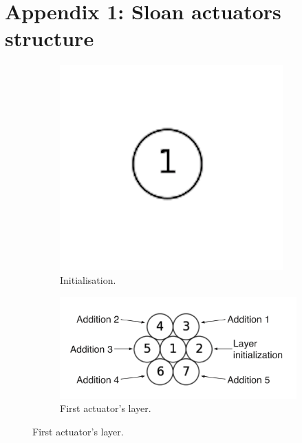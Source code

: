 \section{Appendix 1: Sloan actuators structure}

\begin{figure}[h]
\begin{center}
	\begin{subfigure}{0.22\textwidth}
	\includegraphics[width=\textwidth]{circles/initialisation}
	\caption{Initialisation.}
	\label{fig:appendix:sloan_structure:initialization}
	\end{subfigure}
	\begin{subfigure}{0.54\textwidth}
	\includegraphics[width=\textwidth]{circles/layer_1}
	\caption{First actuator's layer.}
	\label{fig:appendix:sloan_structure:layer_1}
	\end{subfigure}
	

\end{center}
\end{figure}
